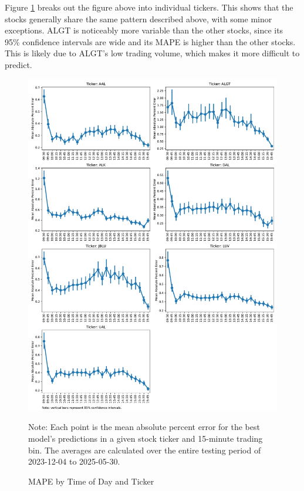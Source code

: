 \documentclass[12pt]{article}
\begin{document}
Figure \ref{fig:mape_by_time_by_ticker} breaks out the figure above into individual tickers. This shows that the stocks generally share the same pattern described above, with some minor exceptions. ALGT is noticeably more variable than the other stocks, since its 95\% confidence intervals are wide and its MAPE is higher than the other stocks. This is likely due to ALGT's low trading volume, which makes it more difficult to predict.
\begin{figure}[H]
    \centering
    \caption{MAPE by Time of Day and Ticker}
    \includegraphics[width=0.75\linewidth]{../Output/mape_by_time_by_ticker.pdf}
    \begin{minipage}{0.75\linewidth}
        \footnotesize
        \singlespacing
        Note: Each point is the mean absolute percent error for the best model's predictions in a given stock ticker and 15-minute trading bin. The averages are calculated over the entire testing period of 2023-12-04 to 2025-05-30.
    \end{minipage}
    \label{fig:mape_by_time_by_ticker}
\end{figure}
\end{document}
